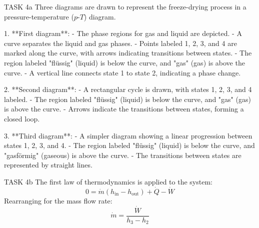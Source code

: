 TASK 4a  
Three diagrams are drawn to represent the freeze-drying process in a pressure-temperature (\(p\)-\(T\)) diagram.  

1. **First diagram**:  
   - The phase regions for gas and liquid are depicted.  
   - A curve separates the liquid and gas phases.  
   - Points labeled 1, 2, 3, and 4 are marked along the curve, with arrows indicating transitions between states.  
   - The region labeled "flüssig" (liquid) is below the curve, and "gas" (gas) is above the curve.  
   - A vertical line connects state 1 to state 2, indicating a phase change.  

2. **Second diagram**:  
   - A rectangular cycle is drawn, with states 1, 2, 3, and 4 labeled.  
   - The region labeled "flüssig" (liquid) is below the curve, and "gas" (gas) is above the curve.  
   - Arrows indicate the transitions between states, forming a closed loop.  

3. **Third diagram**:  
   - A simpler diagram showing a linear progression between states 1, 2, 3, and 4.  
   - The region labeled "flüssig" (liquid) is below the curve, and "gasförmig" (gaseous) is above the curve.  
   - The transitions between states are represented by straight lines.  

TASK 4b  
The first law of thermodynamics is applied to the system:  
\[
0 = \dot{m} (h_{\text{in}} - h_{\text{out}}) + \dot{Q} - \dot{W}
\]  
Rearranging for the mass flow rate:  
\[
\dot{m} = \frac{\dot{W}}{h_3 - h_2}
\]